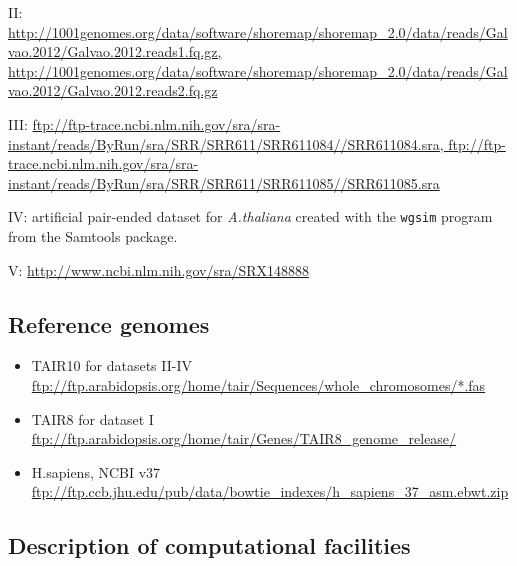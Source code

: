 \documentclass[11pt, oneside]{article}   	%
\begin{document}
II: \url{http://1001genomes.org/data/software/shoremap/shoremap\_2.0/data/reads/Galvao.2012/Galvao.2012.reads1.fq.gz, http://1001genomes.org/data/software/shoremap/shoremap\_2.0/data/reads/Galvao.2012/Galvao.2012.reads2.fq.gz}	

III: \url{ftp://ftp-trace.ncbi.nlm.nih.gov/sra/sra-instant/reads/ByRun/sra/SRR/SRR611/SRR611084//SRR611084.sra, ftp://ftp-trace.ncbi.nlm.nih.gov/sra/sra-instant/reads/ByRun/sra/SRR/SRR611/SRR611085//SRR611085.sra}

IV: artificial pair-ended dataset for {\it A.thaliana} created with the {\tt wgsim} program from the Samtools package.

V: \url{http://www.ncbi.nlm.nih.gov/sra/SRX148888}


\subsection{Reference genomes}
\begin{itemize}
\item TAIR10 for datasets II-IV \url{ftp://ftp.arabidopsis.org/home/tair/Sequences/whole\_chromosomes/*.fas}
\item TAIR8 for dataset I \url{ftp://ftp.arabidopsis.org/home/tair/Genes/TAIR8\_genome\_release/}
\item H.sapiens, NCBI v37 \url{ftp://ftp.ccb.jhu.edu/pub/data/bowtie\_indexes/h\_sapiens\_37\_asm.ebwt.zip}
\end{itemize}

\subsection{Description of computational facilities}
\end{document}
